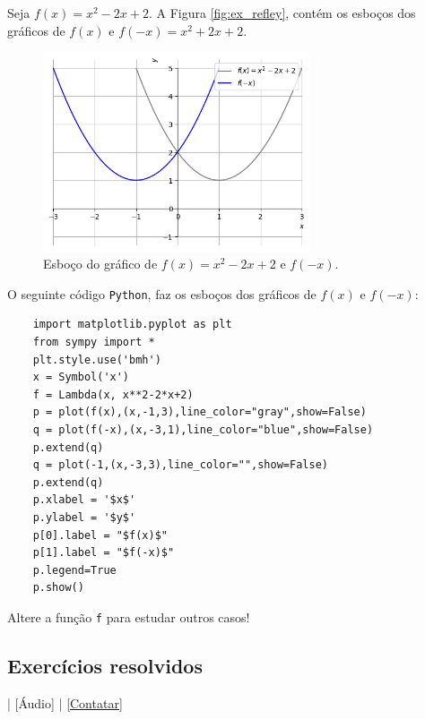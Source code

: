 \begin{ex}
  Seja $f(x) = x^2-2x+2$. A Figura \ref{fig:ex_refley}, contém os esboços dos gráficos de $f(x)$ e $f(-x) = x^2+2x+2$.

  \begin{figure}[H]
    \centering
    \includegraphics[width=0.7\textwidth]{./cap_funcao/dados/fig_ex_refley/fig_ex_refley}
    \caption{Esboço do gráfico de $f(x) = x^2-2x+2$ e $f(-x)$.}
    \label{fig:ex_reflex}
  \end{figure}

  \ifispython
  O seguinte código \verb+Python+, faz os esboços dos gráficos de $f(x)$ e $f(-x)$:
  \begin{lstlisting}
    import matplotlib.pyplot as plt
    from sympy import *
    plt.style.use('bmh')
    x = Symbol('x')
    f = Lambda(x, x**2-2*x+2)
    p = plot(f(x),(x,-1,3),line_color="gray",show=False)
    q = plot(f(-x),(x,-3,1),line_color="blue",show=False)
    p.extend(q)
    q = plot(-1,(x,-3,3),line_color="",show=False)
    p.extend(q)
    p.xlabel = '$x$'
    p.ylabel = '$y$'
    p[0].label = "$f(x)$"
    p[1].label = "$f(-x)$"
    p.legend=True
    p.show()
  \end{lstlisting}
  Altere a função \verb+f+ para estudar outros casos!
  \fi
\end{ex}

\subsection*{Exercícios resolvidos}

\begin{flushright}
  [Vídeo] | [Áudio] | \href{https://phkonzen.github.io/notas/contato.html}{[Contatar]}
\end{flushright}

